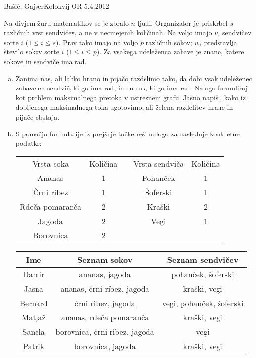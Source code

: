 \begin{naloga}{Bašić, Gajser}{Kolokvij OR 5.4.2012}
\begin{vprasanje}
Na divjem žuru matematikov se je zbralo $n$ ljudi.
Organizator je priskrbel $s$ različnih vrst sendvičev,
a ne v neomejenih količinah.
Na voljo imajo $u_i$ sendvičev sorte $i$ ($1 \le i \le s$).
Prav tako imajo na voljo $p$ različnih sokov;
$w_i$ predstavlja število sokov sorte $i$ ($1 \le i \le p$).
Za vsakega udeleženca zabave je znano,
katere sokove in sendviče ima rad.

\begin{enumerate}[(a)]
\item Zanima nas, ali lahko hrano in pijačo razdelimo tako,
da dobi vsak udeleženec zabave en sendvič, ki ga ima rad,
in en sok, ki ga ima rad.
Nalogo formuliraj kot problem maksimalnega pretoka v ustreznem grafu.
Jasno napiši, kako iz dobljenega maksimalnega toka ugotovimo,
ali želena razdelitev hrane in pijače obstaja.

\item S pomočjo formulacije iz prejšnje točke
reši nalogo za naslednje konkretne podatke:
\begin{center}
\begin{tabular}{c|ccc|c}
Vrsta soka & Količina & \quad & Vrsta sendviča & Količina \\
\cline{1-2} \cline{4-5}
Ananas          & 1 && Pohanček & 1 \\
Črni ribez      & 1 && Šoferski & 1 \\
Rdeča pomaranča & 2 && Kraški   & 2 \\
Jagoda          & 2 && Vegi     & 1 \\
Borovnica       & 2
\end{tabular}

\bigskip
\begin{tabular}{c|c|c}
Ime & Seznam sokov & Seznam sendvičev \\ \hline
Damir   & ananas, jagoda                & pohanček, šoferski       \\
Jasna   & ananas, črni ribez, jagoda    & kraški, vegi             \\
Bernard & črni ribez, jagoda            & vegi, pohanček, šoferski \\
Matjaž  & ananas, rdeča pomaranča       & kraški, vegi             \\
Sanela  & borovnica, črni ribez, jagoda & vegi                     \\
Patrik  & borovnica, jagoda             & kraški, vegi
\end{tabular}
\end{center}
\end{enumerate}
\end{vprasanje}
\begin{odgovor}
\end{odgovor}
\end{naloga}
